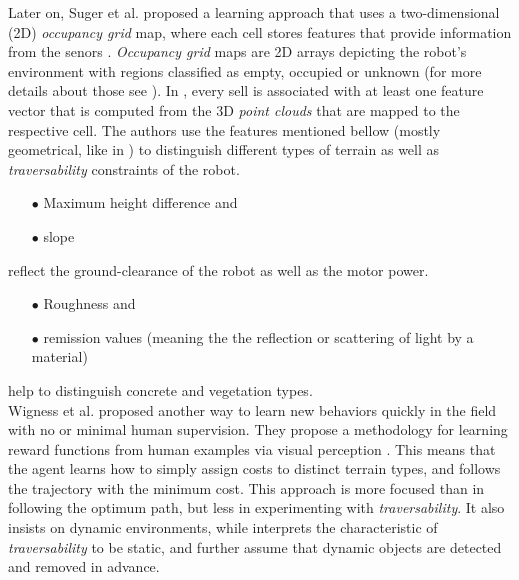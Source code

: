 \documentclass[12pt,a4paper]{report}
\newcommand{\term}{\textit}
\newcommand{\acronym}{\MakeUppercase}
\begin{document}
	Later on, Suger et al. proposed a learning approach that uses a two-dimensional 
	(\acronym{2d}) \term{occupancy grid} map, where each cell stores features 
	that provide information from the senors \cite{Suger}. \term{Occupancy grid} 
	maps are \acronym{2d} arrays depicting the robot’s environment with regions 
	classified as empty, occupied or unknown (for more details about those see 
	\cite{Moravec}). In \cite{Suger}, every sell is associated with at least one 
	feature vector that is computed from the \acronym{3d} \term{point clouds} that 
	are mapped to the respective cell. The authors use the features mentioned 
	bellow (mostly geometrical, like in \cite{Lalonde}) to distinguish different 
	types of terrain as well as \term{traversability} constraints of the robot. 
	\begin{enumerate}
		\item[$\bullet$] Maximum height difference and
		\item[$\bullet$] slope 
	\end{enumerate}
	reflect the ground-clearance of the robot as well as the motor power.
	\begin{enumerate}
		\item[$\bullet$] Roughness and
		\item[$\bullet$] remission values (meaning the the reflection or scattering 
		of light by a material) 
	\end{enumerate}
	help to distinguish concrete and vegetation types.
	\\
	
	Wigness et al. proposed another way to learn new behaviors quickly in the 
	field with no or minimal human supervision. They propose a methodology for 
	learning reward functions from human examples via visual perception 
	\cite{Wigness}. This means that the agent learns how to simply assign costs 
	to distinct terrain types, and follows the trajectory with the minimum cost. 
	This approach is more focused than \cite{Suger} in following the optimum path, 
	but less in experimenting with \term{traversability}. It also insists on 
	dynamic environments, while \cite{Suger} interprets the characteristic of 
	\term{traversability} to be static, and further assume that dynamic objects 
	are detected and removed in advance.
	\\
	
\end{document}
